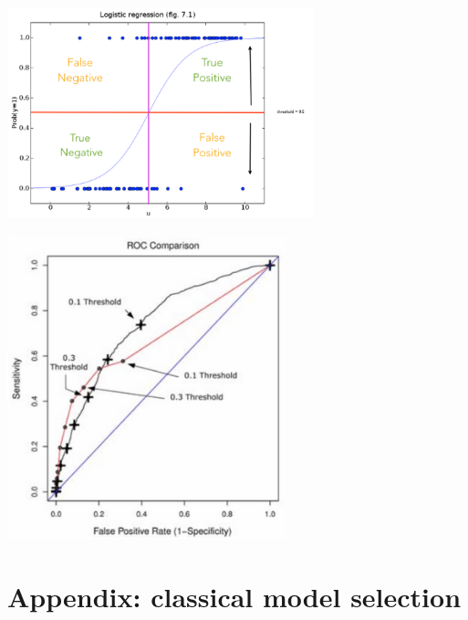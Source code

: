 \documentclass[11pt, oneside]{article}
\begin{document}
\begin{minipage}{0.5\linewidth} 
\hspace{1.2em}\includegraphics[width=3.5in]{logistic.png}

\includegraphics[width=3.175in]{roc.png}
\end{minipage}

\newpage


\section*{Appendix: classical model selection}
\end{document}
